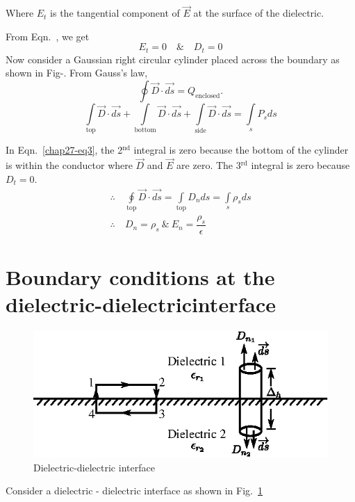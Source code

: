 Where $E_{t}$ is the tangential component of $\vec{E}$ at the surface of the dielectric. 

From Eqn.~\label{chap27-eq2}, we get 
$$
\textstyle E_{t} = 0\quad \text{\&}\quad D_{t} = 0
$$
Now consider a Gaussian right circular cylinder placed across the boundary as shown in Fig-. From Gauss's law, 
$$
\textstyle\oint \vec{D} \cdot \vec{ds} = Q_{\text{enclosed}}.
$$
\begin{equation*}
\textstyle\int\limits_{\text{top}} \vec{D} \cdot \vec{ds} + \int\limits_{\text{bottom}} \vec{D} \cdot \vec{ds} + \int\limits_{\text{side}} \vec{D} \cdot \vec{ds} = \int\limits_{s} P_{s}ds\label{chap27-eq3}
\end{equation*}

In Eqn.~\eqref{chap27-eq3}, the 2$^{\text{nd}}$ integral is zero because the bottom of the cylinder is within the conductor where $\vec{D}$ and $\vec{E}$ are zero. The 3$^{\text{rd}}$ integral is zero because $D_{t} = 0$. 
\begin{align*}
\therefore \ & \textstyle\oint\limits_{\text{top}} \vec{D} \cdot \vec{ds} = \int\limits_{\text{top}} D_{n}ds = \int\limits_{s} \rho_{s}ds\\
\therefore \ & D_{n} = \rho_{s} ~\&~ E_{n} = \dfrac{\rho_{s}}{\epsilon}
\end{align*}

\section{Boundary conditions at the dielectric-dielectric\break interface}\label{chap27-sec2}
\begin{figure}[H]
\centering
\includegraphics[scale=1.1]{images/fig2.eps}
\caption{Dielectric-dielectric interface}\label{chap27-fig2}
\end{figure}


Consider a dielectric - dielectric interface as shown in Fig.~\ref{chap27-fig2}

